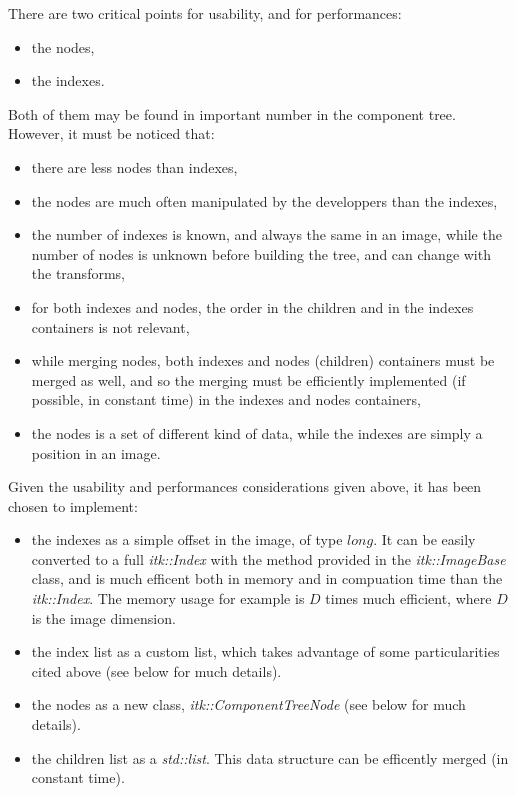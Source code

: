 \documentclass{InsightArticle}
\begin{document}
There are two critical points for usability, and for performances:
\begin{itemize}
  \item the nodes,
  \item the indexes.
\end{itemize}
Both of them may be found in important number in the component tree. However, it must be noticed that:
\begin{itemize}
  \item there are less nodes than indexes,
  \item the nodes are much often manipulated by the developpers than the indexes,
  \item the number of indexes is known, and always the same in an image, while the number of nodes is unknown before building the tree, and can change with the transforms,
  \item for both indexes and nodes, the order in the children and in the indexes containers is not relevant,
  \item while merging nodes, both indexes and nodes (children) containers must be merged as well, and so the merging must be efficiently implemented (if possible, in constant time) in the indexes and nodes containers,
  \item the nodes is a set of different kind of data, while the indexes are simply a position in an image.
\end{itemize}

Given the usability and performances considerations given above, it has been chosen to implement:
\begin{itemize}
  \item the indexes as a simple offset in the image, of type $long$. It can be easily converted to a full {\em itk::Index} with the method provided in the {\em itk::ImageBase} class, and is much efficent both in memory and in compuation time than the {\em itk::Index}. The memory usage for example is $D$ times much efficient, where $D$ is the image dimension.
  \item the index list as a custom list, which takes advantage of some particularities cited above (see below for much details).
  \item the nodes as a new class, {\em itk::ComponentTreeNode} (see below for much details).
  \item the children list as a {\em std::list}. This data structure can be efficently merged (in constant time).
\end{itemize}
\end{document}
